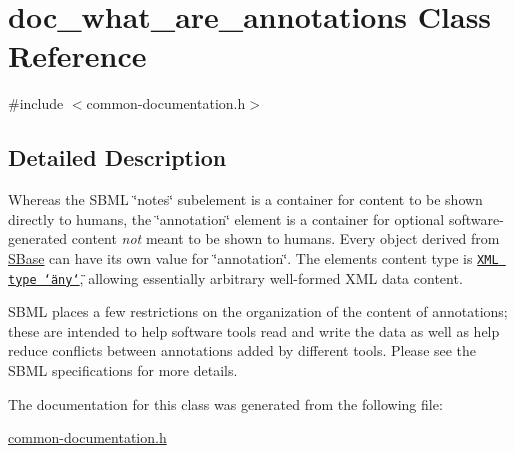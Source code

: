 \hypertarget{classdoc__what__are__annotations}{}\section{doc\+\_\+what\+\_\+are\+\_\+annotations Class Reference}
\label{classdoc__what__are__annotations}


{\ttfamily \#include $<$common-\/documentation.\+h$>$}



\subsection{Detailed Description}
\begin{DoxyParagraph}{}
Whereas the S\+B\+ML \char`\"{}notes\char`\"{} subelement is a container for content to be shown directly to humans, the \char`\"{}annotation\char`\"{} element is a container for optional software-\/generated content {\itshape not} meant to be shown to humans. Every object derived from \hyperlink{class_s_base}{S\+Base} can have its own value for \char`\"{}annotation\char`\"{}. The element\textquotesingle{}s content type is \href{http://www.w3.org/TR/2004/REC-xml-20040204/#elemdecls}{\tt X\+ML type \char`\"{}any\char`\"{}}, allowing essentially arbitrary well-\/formed X\+ML data content.
\end{DoxyParagraph}
S\+B\+ML places a few restrictions on the organization of the content of annotations; these are intended to help software tools read and write the data as well as help reduce conflicts between annotations added by different tools. Please see the S\+B\+ML specifications for more details. 

The documentation for this class was generated from the following file\+:\begin{DoxyCompactItemize}
\item 
\hyperlink{common-documentation_8h}{common-\/documentation.\+h}\end{DoxyCompactItemize}
